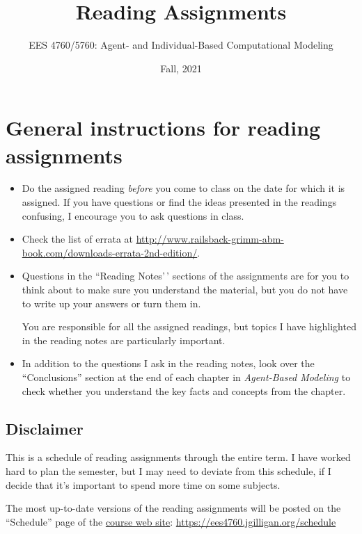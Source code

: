 \documentclass[
]{article}
\title{Reading Assignments}
\author{EES 4760/5760: Agent- and Individual-Based Computational
Modeling}
\date{Fall, 2021}
\begin{document}
\maketitle

\hypertarget{general-instructions-for-reading-assignments}{%
\section{General instructions for reading
assignments}\label{general-instructions-for-reading-assignments}}

\begin{itemize}
\item
  Do the assigned reading \emph{before\/} you come to class on the date
  for which it is assigned. If you have questions or find the ideas
  presented in the readings confusing, I encourage you to ask questions
  in class.
\item
  Check the list of errata at
  \url{http://www.railsback-grimm-abm-book.com/downloads-errata-2nd-edition/}.
\item
  Questions in the ``Reading Notes'\,' sections of the assignments are
  for you to think about to make sure you understand the material, but
  you do not have to write up your answers or turn them in.

  You are responsible for all the assigned readings, but topics I have
  highlighted in the reading notes are particularly important.
\item
  In addition to the questions I ask in the reading notes, look over the
  ``Conclusions'' section at the end of each chapter in
  \emph{Agent-Based Modeling} to check whether you understand the key
  facts and concepts from the chapter.
\end{itemize}

\hypertarget{disclaimer}{%
\subsection{Disclaimer}\label{disclaimer}}

This is a schedule of reading assignments through the entire term. I
have worked hard to plan the semester, but I may need to deviate from
this schedule, if I decide that it's important to spend more time on
some subjects.

The most up-to-date versions of the reading assignments will be posted
on the ``Schedule'' page of the
\href{https://ees4760.jgilligan.org/schedule}{course web site}:
\url{https://ees4760.jgilligan.org/schedule}
\end{document}
